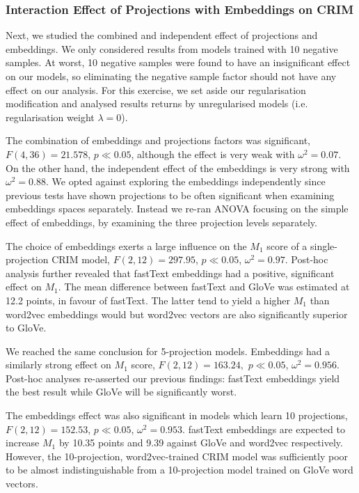 \subsubsection{Interaction Effect of Projections with Embeddings on CRIM}
Next, we studied the combined and independent effect of projections and embeddings.  We only considered results from models trained with 10 negative samples.  At worst, 10 negative samples were found to have an insignificant effect on our models, so eliminating the negative sample factor should not have any effect on our analysis.  For this exercise, we set aside our regularisation modification and analysed results returns by unregularised models (i.e. regularisation weight $\lambda=0$).

The combination of embeddings and projections factors was significant, $F(4,36)=21.578$, $p \ll 0.05$, although the effect is very weak with $\omega^2=0.07$.  On the other hand, the independent effect of the embeddings is very strong with $\omega^2 = 0.88$.  We opted against exploring the embeddings independently since previous tests have shown projections to be often significant when examining embeddings spaces separately.  Instead we re-ran \ac{ANOVA} focusing on the simple effect of embeddings, by examining the three  projection levels separately.

The choice of embeddings exerts a large influence on the $M_1$ score of a single-projection CRIM model, $F(2, 12)=297.95$, $p \ll 0.05$, $\omega^2 = 0.97$.  Post-hoc analysis further revealed that fastText embeddings had a positive, significant effect on $M_1$.  The mean difference between fastText and GloVe was estimated at 12.2 points, in favour of fastText.  The latter tend to yield a higher $M_1$ than word2vec embeddings would but word2vec vectors are also significantly superior to GloVe.

We reached the same conclusion for 5-projection models.  Embeddings had a similarly strong effect on $M_1$ score, $F(2, 12)=163.24,$ $p \ll 0.05$, $\omega^2 = 0.956$.  Post-hoc analyses re-asserted our previous findings: fastText embeddings yield the best result while GloVe will be significantly worst.

The embeddings effect was also significant in models which learn 10 projections, $F(2,12)=152.53$, $p \ll 0.05$, $\omega^2 = 0.953$.  fastText embeddings are expected to increase $M_1$ by 10.35 points and 9.39 against GloVe and word2vec respectively.  However, the 10-projection, word2vec-trained CRIM model was sufficiently poor to be almost indistinguishable from a 10-projection model trained on GloVe word vectors.

